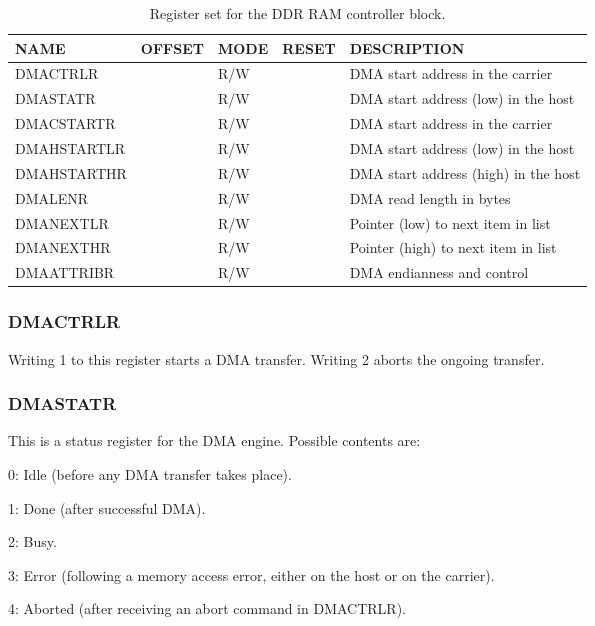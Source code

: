 \documentclass{article}
\newenvironment{packed_item}{
\begin{itemize}
  \setlength{\itemsep}{1pt}
  \setlength{\parskip}{0pt}
  \setlength{\parsep}{0pt}
}{\end{itemize}}
\begin{document}
\begin{table}[htbp]
  \centering
  \begin{tabularx}{\textwidth}{|l|r|l|l|X|}
    \hline
    \textbf{NAME} & \textbf{OFFSET} & \textbf{MODE} & \textbf{RESET} & \textbf{DESCRIPTION} \\
    \hline
    \hline
    DMACTRLR & & R/W & & DMA start address in the carrier\\
    \hline
    DMASTATR & & R/W & & DMA start address (low) in the host\\
    \hline
    DMACSTARTR & & R/W & & DMA start address in the carrier\\
    \hline
    DMAHSTARTLR & & R/W & & DMA start address (low) in the host\\
    \hline
    DMAHSTARTHR & & R/W & & DMA start address (high) in the host\\
    \hline
    DMALENR & & R/W & & DMA read length in bytes\\
    \hline
    DMANEXTLR & & R/W & & Pointer (low) to next item in list\\
    \hline
    DMANEXTHR & & R/W & & Pointer (high) to next item in list\\
    \hline
    DMAATTRIBR & & R/W & & DMA endianness and control\\
    \hline
  \end{tabularx}
  \caption{Register set for the DDR RAM controller block.}
  \label{tab:ddr_control}
\end{table}

\subsubsection{DMACTRLR}
Writing 1 to this register starts a DMA transfer. Writing 2 aborts the ongoing transfer.

\subsubsection{DMASTATR}
This is a status register for the DMA engine. Possible contents are:
\begin{packed_item}
\item 0: Idle (before any DMA transfer takes place).
\item 1: Done (after successful DMA).
\item 2: Busy.
\item 3: Error (following a memory access error, either on the host or on the carrier).
\item 4: Aborted (after receiving an abort command in DMACTRLR).
\end{packed_item}
\end{document}
